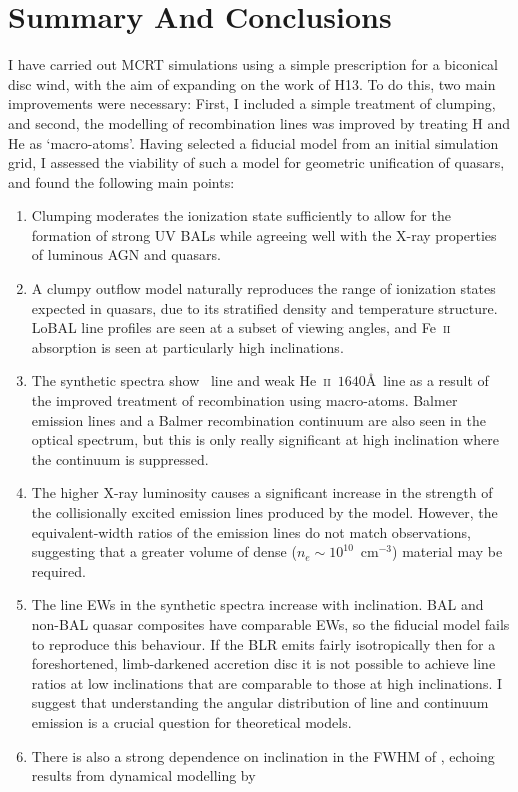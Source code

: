 


\section{Summary And Conclusions}
\label{sec:qso_conclusions}
I have carried out MCRT simulations using a simple
prescription for a biconical disc wind, with
the aim of expanding on the work of H13. To do this, two main
improvements were necessary: First, I included a simple treatment of 
clumping, and second, 
the modelling of recombination lines was improved by treating H and He as
`macro-atoms'. 
Having selected a fiducial model from an initial simulation grid,
I assessed the viability of such a model for geometric 
unification of quasars, and found the following main points:
\begin{enumerate}
\item Clumping moderates the ionization state
sufficiently to allow for the 
formation of strong UV BALs while agreeing well with the X-ray
properties of luminous AGN and quasars. 
\smallskip
\item A clumpy outflow model naturally 
reproduces the range of ionization states
expected in quasars, due to its stratified density
and temperature structure. 
LoBAL line profiles are seen at a subset of viewing angles, and Fe~\textsc{ii}
absorption is seen at particularly high inclinations. 
\smallskip
\item The synthetic spectra show \la\ line and weak He~\textsc{ii}~$1640$\AA\ line
as a result of the improved treatment of recombination using macro-atoms. 
Balmer emission lines and a Balmer recombination continuum are also
seen in the optical spectrum, but this
is only really significant at high inclination where 
the continuum is suppressed.  
\smallskip
\item The higher X-ray luminosity causes a significant 
increase in the strength of the collisionally excited emission
lines produced by the model. 
However, the equivalent-width ratios of the emission lines do not match
observations, suggesting that a greater volume of dense ($n_e\sim10^{10}$~cm$^{-3}$)
material may be required.
\smallskip
\item The line EWs in the synthetic spectra increase with inclination.
BAL and non-BAL quasar composites have comparable EWs, so the fiducial model
fails to reproduce this behaviour.
 If the BLR emits fairly isotropically then for a 
foreshortened, limb-darkened accretion disc 
it is not possible to achieve line ratios at low inclinations 
that are comparable to those at high inclinations. 
I suggest that understanding the angular distribution of 
line and continuum emission is a crucial question for theoretical models.
\smallskip
\item There is also a strong dependence on inclination in the FWHM of
\ha, echoing results from dynamical modelling by \cite{yong2016}
\end{enumerate}

